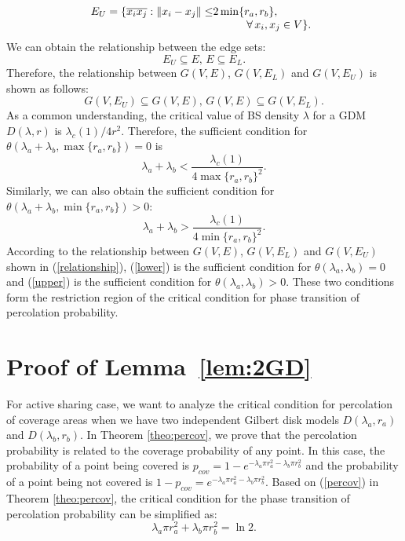 \documentclass[final]{IEEEtran}
\begin{document}
\begin{equation}
\begin{array}{@{}r@{}l}
    E_U=\{\overline{x_{i}x_{j}}:\|x_{i}-x_{j}\|\leq &2\min\{r_{a},r_{b}\},\\
    &\;\;\;\;\;\;\;\;\;\;\;\forall\,x_{i},x_{j}\in V\}.
\end{array}
\end{equation}
\indent We can obtain the relationship between the edge sets:
\begin{equation}
    E_U\subseteq E,\, E\subseteq E_L.
\end{equation}
\indent Therefore, the relationship between $G(V,E)$, $G(V,E_L)$ and $G(V,E_U)$ is shown as follows:
\begin{equation}
    G(V,E_U)\subseteq G(V,E),\,G(V,E)\subseteq G(V,E_L).
    \label{relationship}
\end{equation}
\indent As a common understanding, the critical value of BS density $\lambda$ for a GDM $D(\lambda,r)$ is $\lambda_c(1)/4r^2$. Therefore, the sufficient condition for $\theta(\lambda_a+\lambda_b,\max\{r_{a},r_{b}\})=0$ is 
\begin{equation}
    \lambda_a+\lambda_b<\frac{\lambda_c(1)}{4\max\{r_{a},r_{b}\}^2}.
\label{lower}
\end{equation}
\indent Similarly, we can also obtain the sufficient condition for $\theta(\lambda_a+\lambda_b,\min\{r_{a},r_{b}\})>0$: 
\begin{equation}
    \lambda_a+\lambda_b>\frac{\lambda_c(1)}{4\min\{r_{a},r_{b}\}^2}.
\label{upper}
\end{equation}
\indent According to the relationship between $G(V,E)$, $G(V,E_L)$ and $G(V,E_U)$ shown in (\ref{relationship}), (\ref{lower}) is the sufficient condition for $\theta(\lambda_a,\lambda_b)=0$ and (\ref{upper}) is the sufficient condition for $\theta(\lambda_a,\lambda_b)>0$. These two conditions form the restriction region of the critical condition for phase transition of percolation probability. 
\section{Proof of Lemma~\ref{lem:2GD}} \label{app:2GD}

\indent For active sharing case, we want to analyze the critical condition for percolation of coverage areas when we have two independent Gilbert disk models $D(\lambda_a,r_{a})$ and $D(\lambda_b,r_{b})$. In Theorem \ref{theo:percov}, we prove that the percolation probability is related to the coverage probability of any point. In this case, the probability of a point being covered is $p_{cov}=1-e^{-\lambda_a \pi r_{a}^2 -\lambda_b \pi r_{b}^2}$ and the probability of a point being not covered is $1-p_{cov}=e^{-\lambda_a \pi r_{a}^2 -\lambda_b \pi r_{b}^2}$. Based on (\ref{percov}) in Theorem \ref{theo:percov}, the critical condition for the phase transition of percolation probability can be simplified as: 
\begin{equation}
    \lambda_a \pi r_a^2 + \lambda_b \pi r_b^2 = \ln 2.
\end{equation}
\end{document}
